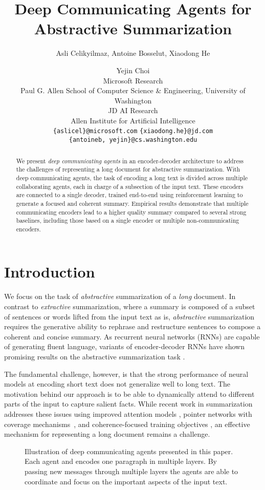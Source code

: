 \documentclass[11pt,a4paper]{article}
\title{Deep Communicating Agents for Abstractive Summarization}
\author{Asli Celikyilmaz, Antoine Bosselut, Xiaodong He \and Yejin Choi\\
Microsoft Research \\
Paul G. Allen School of Computer Science \& Engineering, University of Washington \\
JD AI Research \\
Allen Institute for Artificial Intelligence\\
\texttt{\{aslicel\}@microsoft.com} \: \: \: \texttt{\{xiaodong.he\}@jd.com}\\
\texttt{\{antoineb, yejin\}@cs.washington.edu}
}
\date{}
\begin{document}
\maketitle
\begin{abstract}
We present \textit{deep communicating agents} in an encoder-decoder architecture to address the challenges of representing a long document for abstractive summarization. 
With deep communicating agents, the task of encoding a long text is divided across multiple collaborating agents,
each in charge of a subsection of the input text. These encoders are connected to a single decoder, trained end-to-end using
reinforcement learning to generate a focused and coherent summary. 
Empirical results demonstrate that multiple communicating encoders lead to a higher quality summary compared to several strong baselines, including those based on a single encoder or multiple non-communicating encoders.

\end{abstract}

\section{Introduction}
\label{sec:intro}
We focus on the task of \emph{abstractive} summarization of a \emph{long} document. In contrast to \emph{extractive} summarization, where a summary is composed of a subset of sentences or words lifted from the input text as is, \emph{abstractive} summarization requires the generative ability to rephrase and restructure sentences to compose a coherent and concise summary.
As recurrent neural networks (RNNs) are capable of generating fluent language, variants of encoder-decoder RNNs \cite{seq2seq,bahdanau2014neural} have shown promising results on the abstractive summarization task \cite{deepsummrush,summs2s}. 

The fundamental challenge, however, is that the strong performance of neural models at encoding short text does not generalize well to long text. The motivation behind our approach is to be able to dynamically attend to different parts of the input to capture salient facts. While recent work in summarization addresses these issues using improved attention models \cite{deepsummchopra}, pointer networks with coverage mechanisms~\cite{summpoinernet}, and coherence-focused training objectives \cite{rlsummsocher,seqtutor}, 
an effective mechanism for representing a long document remains a challenge.

\begin{figure}[t]
\begin{center} 
\end{center} 
\vskip -0.27in
\caption{Illustration of deep communicating agents presented in this paper. Each agent  and  encodes one paragraph in multiple layers. 
By passing new messages through multiple layers the agents are able to coordinate and
focus on the important aspects of the input text.}
\label{agentcomm}
\end{figure}
\end{document}
